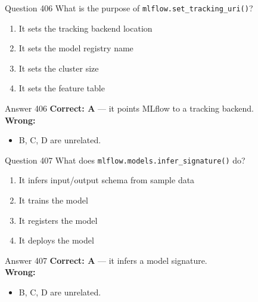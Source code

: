 \documentclass[aspectratio=169,11pt]{beamer}
\begin{document}
	\begin{frame}{Question 406}
		What is the purpose of \texttt{mlflow.set\_tracking\_uri()}?
		\begin{enumerate}[label=\Alph*.]
			\item It sets the tracking backend location
			\item It sets the model registry name
			\item It sets the cluster size
			\item It sets the feature table
		\end{enumerate}
	\end{frame}
	\begin{frame}{Answer 406}
		\textbf{Correct: A} --- it points MLflow to a tracking backend.\\
		\vspace{0.5em}
		\textbf{Wrong:}
		\begin{itemize}
			\item B, C, D are unrelated.
		\end{itemize}
	\end{frame}
	
	\begin{frame}{Question 407}
		What does \texttt{mlflow.models.infer\_signature()} do?
		\begin{enumerate}[label=\Alph*.]
			\item It infers input/output schema from sample data
			\item It trains the model
			\item It registers the model
			\item It deploys the model
		\end{enumerate}
	\end{frame}
	\begin{frame}{Answer 407}
		\textbf{Correct: A} --- it infers a model signature.\\
		\vspace{0.5em}
		\textbf{Wrong:}
		\begin{itemize}
			\item B, C, D are unrelated.
		\end{itemize}
	\end{frame}
	
\end{document}
